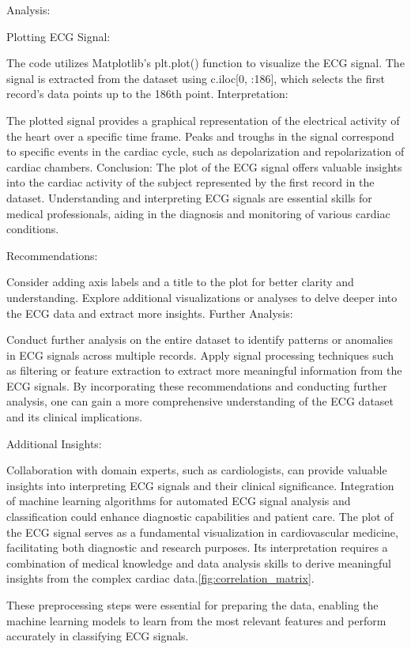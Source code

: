 \documentclass{report}
\begin{document}
Analysis:

Plotting ECG Signal:

The code utilizes Matplotlib's plt.plot() function to visualize the ECG signal.
The signal is extracted from the dataset using c.iloc[0, :186], which selects the first record's data points up to the 186th point.
Interpretation:

The plotted signal provides a graphical representation of the electrical activity of the heart over a specific time frame.
Peaks and troughs in the signal correspond to specific events in the cardiac cycle, such as depolarization and repolarization of cardiac chambers.
Conclusion:
The plot of the ECG signal offers valuable insights into the cardiac activity of the subject represented by the first record in the dataset. Understanding and interpreting ECG signals are essential skills for medical professionals, aiding in the diagnosis and monitoring of various cardiac conditions.

Recommendations:

Consider adding axis labels and a title to the plot for better clarity and understanding.
Explore additional visualizations or analyses to delve deeper into the ECG data and extract more insights.
Further Analysis:

Conduct further analysis on the entire dataset to identify patterns or anomalies in ECG signals across multiple records.
Apply signal processing techniques such as filtering or feature extraction to extract more meaningful information from the ECG signals.
By incorporating these recommendations and conducting further analysis, one can gain a more comprehensive understanding of the ECG dataset and its clinical implications.

Additional Insights:

Collaboration with domain experts, such as cardiologists, can provide valuable insights into interpreting ECG signals and their clinical significance.
Integration of machine learning algorithms for automated ECG signal analysis and classification could enhance diagnostic capabilities and patient care.
The plot of the ECG signal serves as a fundamental visualization in cardiovascular medicine, facilitating both diagnostic and research purposes. Its interpretation requires a combination of medical knowledge and data analysis skills to derive meaningful insights from the complex cardiac data.\ref{fig:correlation_matrix}.


These preprocessing steps were essential for preparing the data, enabling the machine learning models to learn from the most relevant features and perform accurately in classifying ECG signals.
\end{document}
